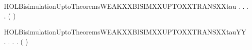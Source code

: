 \newcommand{\HOLBisimulationUptoTheoremsWEAKXXBISIMXXUPTOXXTRANSXXlabelYY}{\UseVerbatim{HOLBisimulationUptoTheoremsWEAKXXBISIMXXUPTOXXTRANSXXlabelYY}}
\begin{SaveVerbatim}{HOLBisimulationUptoTheoremsWEAKXXBISIMXXUPTOXXTRANSXXtau}
\HOLTokenTurnstile{} \HOLSymConst{\HOLTokenForall{}}.
         \HOLSymConst{\HOLTokenImp{}}
       \HOLSymConst{\HOLTokenForall{}} .
              \HOLSymConst{\HOLTokenImp{}}
           \HOLSymConst{\HOLTokenForall{}}.
                \HOLTokenTransBegin\HOLConst{\ensuremath{\tau}}\HOLTokenTransEnd {} \HOLSymConst{\HOLTokenImp{}}
               \HOLSymConst{\HOLTokenExists{}}.
                      \HOLSymConst{\HOLTokenConj{}}
                   (    )  
\end{SaveVerbatim}
\newcommand{\HOLBisimulationUptoTheoremsWEAKXXBISIMXXUPTOXXTRANSXXtau}{\UseVerbatim{HOLBisimulationUptoTheoremsWEAKXXBISIMXXUPTOXXTRANSXXtau}}
\begin{SaveVerbatim}{HOLBisimulationUptoTheoremsWEAKXXBISIMXXUPTOXXTRANSXXtauYY}
\HOLTokenTurnstile{} \HOLSymConst{\HOLTokenForall{}}.
         \HOLSymConst{\HOLTokenImp{}}
       \HOLSymConst{\HOLTokenForall{}} .
              \HOLSymConst{\HOLTokenImp{}}
           \HOLSymConst{\HOLTokenForall{}}.
                \HOLTokenTransBegin\HOLConst{\ensuremath{\tau}}\HOLTokenTransEnd {} \HOLSymConst{\HOLTokenImp{}}
               \HOLSymConst{\HOLTokenExists{}}.
                      \HOLSymConst{\HOLTokenConj{}}
                   (    )  
\end{SaveVerbatim}
\newcommand{\HOLBisimulationUptoTheoremsWEAKXXBISIMXXUPTOXXTRANSXXtauYY}{\UseVerbatim{HOLBisimulationUptoTheoremsWEAKXXBISIMXXUPTOXXTRANSXXtauYY}}
